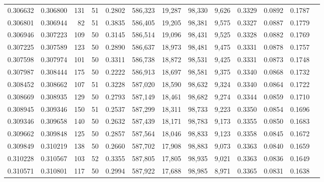 \begin{tabular}{rrrrrrrrrrrrr}
0.306632 & 0.306800 &   131 &  51 &                                     0.2802 & 586,323 &  19,287 &  98,330 &   9,626 & 0.3329 & 0.0892 & 0.1787 \\
0.306801 & 0.306944 &    82 &  51 &                                     0.3835 & 586,405 &  19,205 &  98,381 &   9,575 & 0.3327 & 0.0887 & 0.1779 \\
0.306946 & 0.307223 &   109 &  50 &                                     0.3145 & 586,514 &  19,096 &  98,431 &   9,525 & 0.3328 & 0.0882 & 0.1769 \\
0.307225 & 0.307589 &   123 &  50 &                                     0.2890 & 586,637 &  18,973 &  98,481 &   9,475 & 0.3331 & 0.0878 & 0.1757 \\
0.307598 & 0.307974 &   101 &  50 &                                     0.3311 & 586,738 &  18,872 &  98,531 &   9,425 & 0.3331 & 0.0873 & 0.1748 \\
0.307987 & 0.308444 &   175 &  50 &                                     0.2222 & 586,913 &  18,697 &  98,581 &   9,375 & 0.3340 & 0.0868 & 0.1732 \\
0.308452 & 0.308662 &   107 &  51 &                                     0.3228 & 587,020 &  18,590 &  98,632 &   9,324 & 0.3340 & 0.0864 & 0.1722 \\
0.308669 & 0.308935 &   129 &  50 &                                     0.2793 & 587,149 &  18,461 &  98,682 &   9,274 & 0.3344 & 0.0859 & 0.1710 \\
0.308945 & 0.309346 &   150 &  51 &                                     0.2537 & 587,299 &  18,311 &  98,733 &   9,223 & 0.3350 & 0.0854 & 0.1696 \\
0.309346 & 0.309658 &   140 &  50 &                                     0.2632 & 587,439 &  18,171 &  98,783 &   9,173 & 0.3355 & 0.0850 & 0.1683 \\
0.309662 & 0.309848 &   125 &  50 &                                     0.2857 & 587,564 &  18,046 &  98,833 &   9,123 & 0.3358 & 0.0845 & 0.1672 \\
0.309849 & 0.310219 &   138 &  50 &                                     0.2660 & 587,702 &  17,908 &  98,883 &   9,073 & 0.3363 & 0.0840 & 0.1659 \\
0.310228 & 0.310567 &   103 &  52 &                                     0.3355 & 587,805 &  17,805 &  98,935 &   9,021 & 0.3363 & 0.0836 & 0.1649 \\
0.310571 & 0.310801 &   117 &  50 &                                     0.2994 & 587,922 &  17,688 &  98,985 &   8,971 & 0.3365 & 0.0831 & 0.1638 \\

\end{tabular}
